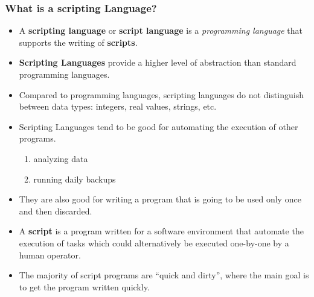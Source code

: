 \documentclass[10pt,t]{beamer}
\newcommand*\vardiamond{\textcolor{lubrown}{%
  \ensuremath{\blacklozenge}}}
\begin{document}
\begin{frame}
  \frametitle{What is a scripting Language?}
  \begin{exampleblock}{}%
    \begin{itemize}
      \item A \textbf{scripting language} or \textbf{script language} is a \emph{programming language} that supports the writing of \textbf{scripts}.
      \item \textbf{Scripting Languages} provide a higher level of abstraction than standard programming languages.
      \item Compared to programming languages, scripting languages do not distinguish between data types: integers, real values, strings, etc.
      \item Scripting Languages tend to be good for automating the execution of other programs.
      \begin{enumerate}
          \item[$\vardiamond$] analyzing data
          \item[$\vardiamond$] running daily backups
      \end{enumerate}
      \item They are also good for writing a program that is going to be used only once and then discarded.
      \item A \textbf{script} is a program written for a software environment that automate the execution of tasks which could alternatively be executed one-by-one by a human operator.
      \item The majority of script programs are ``quick and dirty'', where the main goal is to get the program written quickly.
    \end{itemize}
  \end{exampleblock}
\end{frame}
\end{document}
